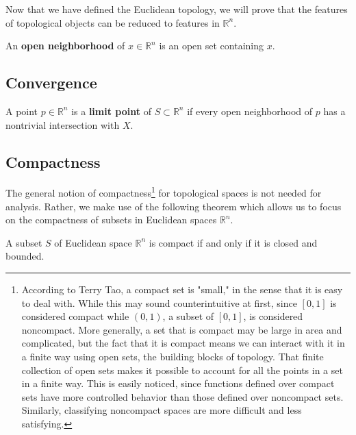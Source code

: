 \documentclass{article}
\begin{document}
    Now that we have defined the Euclidean topology, we will prove that the features of topological objects can be reduced to features in $\mathbb{R}^n$. 

    \begin{definition}
      An \textbf{open neighborhood} of $x \in \mathbb{R}^n$ is an open set containing $x$. 
    \end{definition}

    \begin{theorem}
      
    \end{theorem}

  \subsection{Convergence} 

    \begin{definition}
      A point $p \in \mathbb{R}^n$ is a \textbf{limit point} of $S \subset \mathbb{R}^n$ if every open neighborhood of $p$ has a nontrivial intersection with $X$. 
    \end{definition}

  \subsection{Compactness}

    The general notion of compactness\footnote{According to Terry Tao, a compact set is "small," in the sense that it is easy to deal with. While this may sound counterintuitive at first, since $[0,1]$ is considered compact while $(0,1)$, a subset of $[0,1]$, is considered noncompact. More generally, a set that is compact may be large in area and complicated, but the fact that it is compact means we can interact with it in a finite way using open sets, the building blocks of topology. That finite collection of open sets makes it possible to account for all the points in a set in a finite way. This is easily noticed, since functions defined over compact sets have more controlled behavior than those defined over noncompact sets. Similarly, classifying noncompact spaces are more difficult and less satisfying. } for topological spaces is not needed for analysis. Rather, we make use of the following theorem which allows us to focus on the compactness of subsets in Euclidean spaces $\mathbb{R}^n$. 

    \begin{theorem} 
    A subset $S$ of Euclidean space $\mathbb{R}^n$ is compact if and only if it is closed and bounded. 
    \end{theorem}
\end{document}
